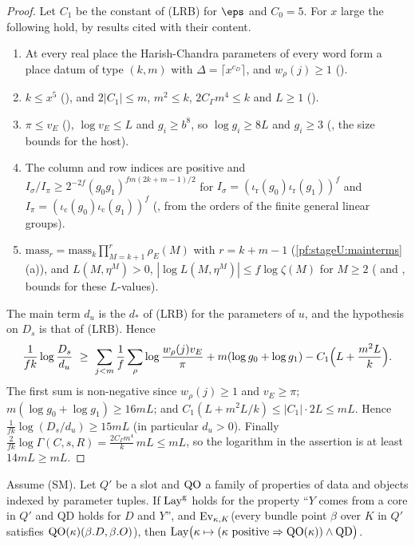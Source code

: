 \begin{proof}
Let $C_1$ be the constant of (LRB) for $\eps$ and $C_0=5$. For $x$ large the following hold, by results cited with their
content.
\begin{enumerate}[label=(\roman*)]
\item At every real place the Harish-Chandra parameters of every word form a place datum of type $(k,m)$ with
$\Delta=\lceil x^{c_D}\rceil$, and $w_\rho(j)\ge1$ ().
\item $k\le x^5$ (), and $2|C_1|\le m$, $m^2\le k$, $2C_\Gamma m^4\le k$ and
$L\ge1$ ().
\item $\pi\le v_E$ (), $\log v_E\le L$ and $g_i\ge b^8$, so $\log g_i\ge8L$ and $g_i\ge3$
(, the size bounds for the host).
\item The column and row indices are positive and $I_\sigma/I_\pi\ge2^{-2f}(g_0g_1)^{fm(2k+m-1)/2}$ for
$I_\sigma=(\iota_{\mathrm r}(g_0)\iota_{\mathrm r}(g_1))^f$ and $I_\pi=(\iota_{\mathrm c}(g_0)\iota_{\mathrm c}(g_1))^f$
(, from the orders of the finite general linear groups).
\item $\mathrm{mass}_r=\mathrm{mass}_k\prod_{M=k+1}^{r}\rho_E(M)$ with $r=k+m-1$ (\cref{pf:stageU:mainterms}(a)), and
$L(M,\eta^M)>0$, $|\log L(M,\eta^M)|\le f\log\zeta(M)$ for $M\ge2$
( and
, bounds for these $L$-values).
\end{enumerate}
The main term $d_u$ is the $d_*$ of (LRB) for the parameters of $u$, and the hypothesis on $D_s$ is that of (LRB). Hence
\[
\frac1{fk}\log\frac{D_s}{d_u}\ \ge\ \sum_{j<m}\frac1f\sum_\rho\log\frac{w_\rho(j)v_E}{\pi}+m(\log g_0+\log g_1)
-C_1\Bigl(L+\frac{m^2L}k\Bigr).
\]
The first sum is non-negative since $w_\rho(j)\ge1$ and $v_E\ge\pi$; $m(\log g_0+\log g_1)\ge16mL$; and
$C_1(L+m^2L/k)\le|C_1|\cdot2L\le mL$. Hence $\frac1{fk}\log(D_s/d_u)\ge15mL$ (in particular $d_u>0$). Finally
$\frac2{fk}\log\Gamma(C,s,R)=\frac{2C_\Gamma m^4}{k}\,mL\le mL$, so the logarithm in the assertion is at least $14mL\ge mL$.
\end{proof}

\begin{proposition}\label{pf:stageU:recexp}
Assume \textup{(SM)}. Let $Q'$ be a slot and $\mathrm{QO}$ a family of properties of data and objects indexed by parameter
tuples. If $\mathrm{Lay}^{\mathrm g}$ holds for the property ``$Y$ comes from a core in $Q'$ and $\mathrm{QD}$ holds for $D$ and $Y$'',
and $\mathrm{Ev}_{\kappa,K}$(every bundle point $\beta$ over $K$ in $Q'$ satisfies $\mathrm{QO}(\kappa)(\beta.D,\beta.O)$), then
$\mathrm{Lay}\bigl(\kappa\mapsto(\kappa\text{ positive}\Rightarrow\mathrm{QO}(\kappa))\wedge\mathrm{QD}\bigr)$.
\end{proposition}

